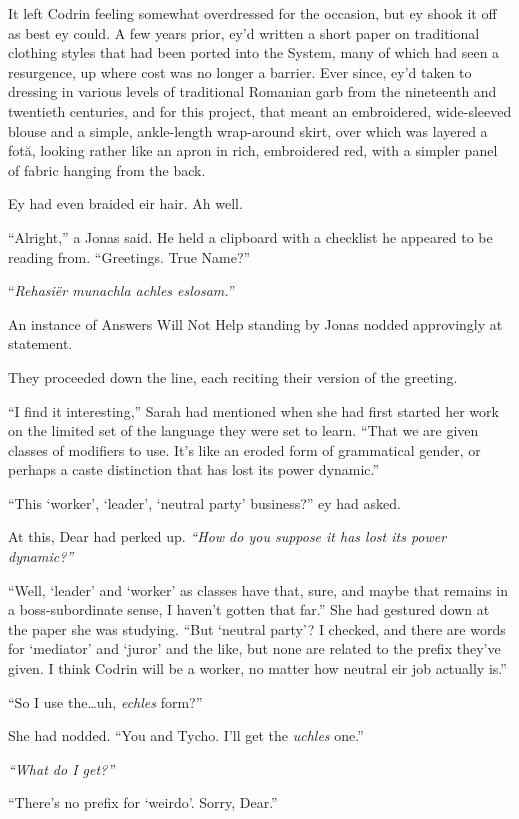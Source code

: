 It left Codrin feeling somewhat overdressed for the occasion, but ey shook it off as best ey could. A few years prior, ey'd written a short paper on traditional clothing styles that had been ported into the System, many of which had seen a resurgence, up where cost was no longer a barrier. Ever since, ey'd taken to dressing in various levels of traditional Romanian garb from the nineteenth and twentieth centuries, and for this project, that meant an embroidered, wide-sleeved blouse and a simple, ankle-length wrap-around skirt, over which was layered a fotă, looking rather like an apron in rich, embroidered red, with a simpler panel of fabric hanging from the back.

Ey had even braided eir hair. Ah well.

``Alright,'' a Jonas said. He held a clipboard with a checklist he appeared to be reading from. ``Greetings. True Name?''

``\emph{Rehasiër munachla achles eslosam.}''

An instance of Answers Will Not Help standing by Jonas nodded approvingly at statement.

They proceeded down the line, each reciting their version of the greeting.

``I find it interesting,'' Sarah had mentioned when she had first started her work on the limited set of the language they were set to learn. ``That we are given classes of modifiers to use. It's like an eroded form of grammatical gender, or perhaps a caste distinction that has lost its power dynamic.''

``This `worker', `leader', `neutral party' business?'' ey had asked.

At this, Dear had perked up. \emph{``How do you suppose it has lost its power dynamic?''}

``Well, `leader' and `worker' as classes have that, sure, and maybe that remains in a boss-subordinate sense, I haven't gotten that far.'' She had gestured down at the paper she was studying. ``But `neutral party'? I checked, and there are words for `mediator' and `juror' and the like, but none are related to the prefix they've given. I think Codrin will be a worker, no matter how neutral eir job actually is.''

``So I use the\ldots uh, \emph{echles} form?''

She had nodded. ``You and Tycho. I'll get the \emph{uchles} one.''

\emph{``What do I get?''}

``There's no prefix for `weirdo'. Sorry, Dear.''

